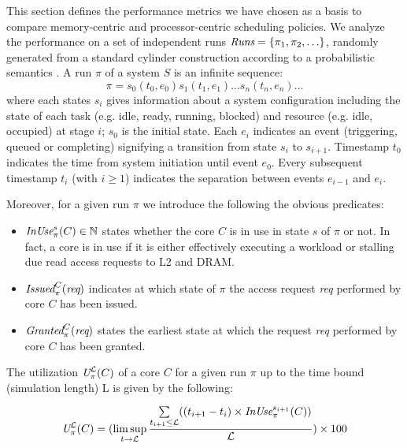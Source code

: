This section defines the performance metrics we have chosen as a basis to compare memory-centric and processor-centric scheduling policies. We analyze the performance on a set of independent runs $\emph{Runs}=\{\pi_1, \pi_2, \ldots\}$, randomly generated from a standard cylinder construction according to a probabilistic semantics \cite{DBLP:conf/formats/DavidLLMPVW11}. A run $\pi$ of a system $S$ is an infinite sequence:
\[ \pi = s_0 (t_0,e_0) s_1 (t_1,e_1) \ldots s_n (t_n,e_n) \ldots \]
\noindent
where each states $s_i$ gives information about a system configuration including the state of each  task (e.g.  idle,  ready,  running,   blocked)  and  resource (e.g. idle,  occupied) at stage  $i$; $s_0$ is the initial state. Each $e_i$ indicates an event (triggering,  queued or completing) signifying a transition from state $s_i$ to $s_{i+1}$. Timestamp $t_0$ indicates the time from system initiation until event $e_0$. Every subsequent timestamp $t_i$ (with $i \geq 1$) indicates the separation between events $e_{i-1}$ and $e_i$.

Moreover, for a given run $\pi$ we introduce the following the obvious predicates: 
\begin{itemize}
\item $\emph{InUse}_{\pi}^s(C)\in\mathbb{N}$ states whether the core $C$ is in use in state $s$ of $\pi$ or not. In fact, a core is in use if it is either effectively executing a workload or stalling due read access requests to L2 and DRAM.   
\item $\emph{Issued}_{\pi}^C(\emph{req})$ indicates at which state of $\pi$ the access request \emph{req} performed by core $C$ has been issued.
\item $\emph{Granted}_{\pi}^C(\emph{req})$ states the earliest state at which the request \emph{req} performed by core $C$ has been granted.
\end{itemize}
 
\begin{definition}
The utilization $\emph{U}_{\pi}^{{\cal L}}(C)$ of a core $C$ for a given run ${\pi}$ up to the time bound (simulation length) {\cal L} is given by the following:\\ 
\begin{footnotesize}
\[
\emph{U}_{\pi}^{{\cal L}}(C) = (\limsup_{t\rightarrow {\cal L}} \frac{\sum\limits_{t_{i+1}\le {\cal L}}((t_{i+1}-t_i)\times \emph{InUse}_{\pi}^{s_{i+1}}(C))
}{{\cal L}}) \times 100
\]
\end{footnotesize}
\end{definition}

